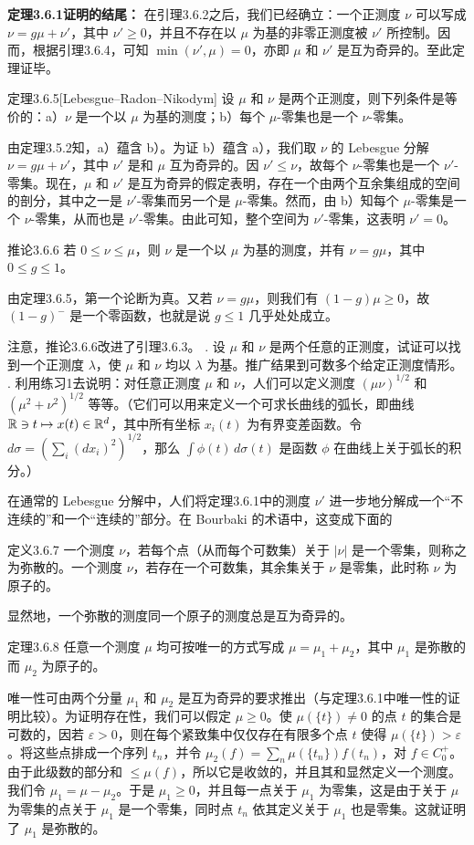 \textbf{定理3.6.1证明的结尾：} 在引理3.6.2之后，我们已经确立：一个正测度 $\nu$ 可以写成 $\nu=g\mu+\nu'$，其中 $\nu'\ge0$，并且不存在以 $\mu$ 为基的非零正测度被 $\nu'$ 所控制。因而，根据引理3.6.4，可知 $\min(\nu',\mu)=0$，亦即 $\mu$ 和 $\nu'$ 是互为奇异的。至此定理证毕。
\begin{statement}{定理}{3.6.5}[Lebesgue--Radon--Nikodym]
设 $\mu$ 和 $\nu$ 是两个正测度，则下列条件是等价的：a）$\nu$ 是一个以 $\mu$ 为基的测度；b）每个 $\mu$-零集也是一个 $\nu$-零集。
\end{statement}
\Proof 由定理3.5.2知，a）蕴含 b）。为证 b）蕴含 a），我们取 $\nu$ 的 Lebesgue 分解 $\nu=g\mu+\nu'$，其中 $\nu'$ 是和 $\mu$ 互为奇异的。因 $\nu'\le\nu$，故每个 $\nu$-零集也是一个 $\nu'$-零集。现在，$\mu$ 和 $\nu'$ 是互为奇异的假定表明，存在一个由两个互余集组成的空间的剖分，其中之一是 $\nu'$-零集而另一个是 $\mu$-零集。然而，由 b）知每个 $\mu$-零集是一个 $\nu$-零集，从而也是 $\nu'$-零集。由此可知，整个空间为 $\nu'$-零集，这表明 $\nu'=0$。
\begin{statement}{推论}{3.6.6}
若 $0\le\nu\le\mu$，则 $\nu$ 是一个以 $\mu$ 为基的测度，并有 $\nu=g\mu$，其中 $0\le g\le1$。
\end{statement}
\Proof 由定理3.6.5，第一个论断为真。又若 $\nu=g\mu$，则我们有 $(1-g)\mu\ge0$，故 $(1-g)^-$ 是一个零函数，也就是说 $g\le1$ 几乎处处成立。

注意，推论3.6.6改进了引理3.6.3。
. 设 $\mu$ 和 $\nu$ 是两个任意的正测度，试证可以找到一个正测度 $\lambda$，使 $\mu$ 和 $\nu$ 均以 $\lambda$ 为基。推广结果到可数多个给定正测度情形。
. 利用练习1去说明：对任意正测度 $\mu$ 和 $\nu$，人们可以定义测度 $(\mu\nu)^{1/2}$ 和 $(\mu^2+\nu^2)^{1/2}$ 等等。（它们可以用来定义一个可求长曲线的弧长，即曲线 $\mathbb R\ni t\mapsto x(t)\in\mathbb R^d$，其中所有坐标
$x_i(t)$ 为有界变差函数。令 $d\sigma=(\sum_i(dx_i)^2)^{1/2}$，那么 $\int\phi(t)\,d\sigma(t)$ 是函数 $\phi$ 在曲线上关于弧长的积分。）

在通常的 Lebesgue 分解中，人们将定理3.6.1中的测度 $\nu'$ 进一步地分解成一个“不连续的”和一个“连续的”部分。在 Bourbaki 的术语中，这变成下面的
\begin{statement}{定义}{3.6.7}
一个测度 $\nu$，若每个点（从而每个可数集）关于 $|\nu|$ 是一个零集，则称之为弥散的。一个测度 $\nu$，若存在一个可数集，其余集关于 $\nu$ 是零集，此时称 $\nu$ 为原子的。
\end{statement}
显然地，一个弥散的测度同一个原子的测度总是互为奇异的。
\begin{statement}{定理}{3.6.8}
任意一个测度 $\mu$ 均可按唯一的方式写成 $\mu=\mu_1+\mu_2$，其中 $\mu_1$ 是弥散的而 $\mu_2$ 为原子的。
\end{statement}
\Proof 唯一性可由两个分量 $\mu_1$ 和 $\mu_2$ 是互为奇异的要求推出（与定理3.6.1中唯一性的证明比较）。为证明存在性，我们可以假定 $\mu\ge0$。使 $\mu(\{t\})\ne0$ 的点 $t$ 的集合是可数的，因若 $\varepsilon>0$，则在每个紧致集中仅仅存在有限多个点 $t$ 使得 $\mu(\{t\})>\varepsilon$。将这些点排成一个序列 $t_n$，并令 $\mu_2(f)=\sum_n\mu(\{t_n\})f(t_n)$，对 $f\in C_0^+$。由于此级数的部分和 $\le\mu(f)$，所以它是收敛的，并且其和显然定义一个测度。我们令 $\mu_1=\mu-\mu_2$。于是 $\mu_1\ge0$，并且每一点关于 $\mu_1$ 为零集，这是由于关于 $\mu$ 为零集的点关于 $\mu_1$ 是一个零集，同时点 $t_n$ 依其定义关于 $\mu_1$ 也是零集。这就证明了 $\mu_1$ 是弥散的。


